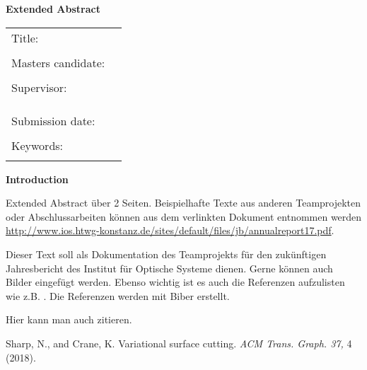 \thispagestyle{plain}
\vspace*{11pt}
\begin{center}
	{\LARGE \textbf{\textsf{Extended Abstract}}}
\end{center}

\bigskip
\begin{center}
	\begin{tabular}{p{3.2cm}p{9.6cm}}
	Title: & \thema \\
	& \\
	Masters candidate: & \autor \\
	& \\
	Supervisor: & \firma \\[1.1ex] & \prueferA  \\[.5ex]
	&  \prueferB \\
	& \\
	Submission date: & \abgabedatum \\
	& \\
	Keywords: & \schlagworte \\
	& \\
	\end{tabular}
\end{center}

\bigskip

\noindent
\textbf{\textsf{Introduction}}
\vspace*{3pt}

Extended Abstract über 2 Seiten. Beispielhafte Texte aus anderen Teamprojekten oder Abschlussarbeiten können aus dem verlinkten Dokument entnommen werden \href{http://www.ios.htwg-konstanz.de/sites/default/files/jb/annualreport17.pdf}{http://www.ios.htwg-konstanz.de/sites/default/files/jb/annualreport17.pdf}.

\noindent Dieser Text soll als Dokumentation des Teamprojekts für den zukünftigen Jahresbericht des Institut für Optische Systeme dienen. Gerne können auch Bilder eingefügt werden. Ebenso wichtig ist es auch die Referenzen aufzulisten wie z.B. \cite{Geim2001}. Die Referenzen werden mit Biber erstellt.

Hier kann man auch zitieren. \cite{ext_sharp}






\begin{thebibliography}{99}
 Sharp, N., and Crane, K. Variational surface cutting. \textit{ACM Trans. Graph. 37,} 4 (2018).
\end{thebibliography}